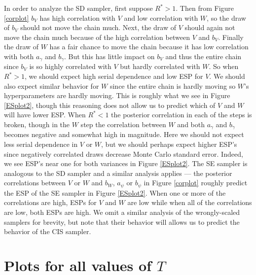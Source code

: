 \documentclass{article}
\begin{document}
In order to analyze the SD sampler, first suppose $R^*>1$. Then from Figure \ref{corplot} $b_V$ has high correlation with $V$ and low correlation with $W$, so the draw of $b_V$ should not move the chain much. Next, the draw of $V$ should again not move the chain much because of the high correlation between $V$ and $b_V$. Finally the draw of $W$ has a fair chance to move the chain because it has low correlation with both $a_\gamma$ and $b_\gamma$. But this has little impact on $b_V$ and thus the entire chain since $b_V$ is so highly correlated with $V$ but hardly correlated with $W$. So when $R^*>1$, we should expect high serial dependence and low ESP for $V$. We should also expect similar behavior for $W$ since the entire chain is hardly moving so $W$'s hyperparameters are hardly moving. This is roughly what we see in Figure \ref{ESplot2}, though this reasoning does not allow us to predict which of $V$ and $W$ will have lower ESP. When $R^*<1$ the posterior correlation in each of the steps is broken, though in the $W$ step the correlation between $W$ and both $a_\gamma$ and $b_\gamma$ becomes negative and somewhat high in magnitude. Here we should not expect less serial dependence in $V$ or $W$, but we should perhaps expect higher ESP's since negatively correlated draws decrease Monte Carlo standard error. Indeed, we see ESP's near one for both variances in Figure \ref{ESplot2}. The SE sampler is analogous to the SD sampler and a similar analysis applies --- the posterior correlations between $V$ or $W$ and $b_W$, $a_\psi$ or $b_\psi$ in Figure \ref{corplot} roughly predict the ESP of the SE sampler in Figure \ref{ESplot2}. When one or more of the correlations are high, ESPs for $V$ and $W$ are low while when all of the correlations are low, both ESPs are high. We omit a similar analysis of the wrongly-scaled samplers for brevity, but note that their behavior will allows us to predict the behavior of the CIS sampler.


\section{Plots for all values of $T$}\label{sec:plots}

\setcounter{figure}{0}    
\end{document}

